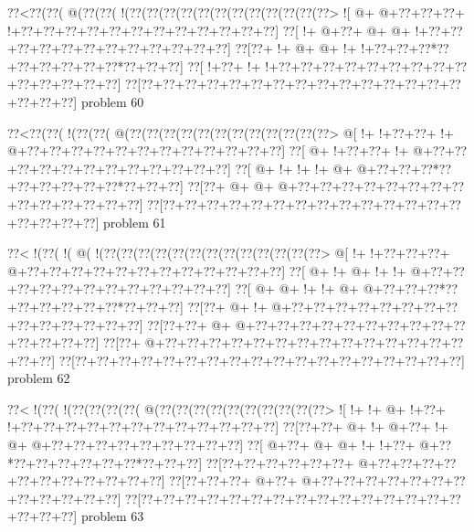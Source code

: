 \vbox{\vbox{\goo
\0??<\0??(\0??(\- @(\0??(\0??(\- !(\0??(\0??(\0??(\0??(\0??(\0??(\0??(\0??(\0??(\0??(\0??(\0??>
\- ![\- @+\- @+\0??+\0??+\0??+\- !+\0??+\0??+\0??+\0??+\0??+\0??+\0??+\0??+\0??+\0??+\0??+\0??]
\0??[\- !+\- @+\0??+\- @+\- @+\- !+\0??+\0??+\0??+\0??+\0??+\0??+\0??+\0??+\0??+\0??+\0??+\0??]
\0??[\0??+\- !+\- @+\- @+\- !+\- !+\0??+\0??+\0??*\0??+\0??+\0??+\0??+\0??+\0??*\0??+\0??+\0??]
\0??[\- !+\0??+\- !+\- !+\0??+\0??+\0??+\0??+\0??+\0??+\0??+\0??+\0??+\0??+\0??+\0??+\0??+\0??]
\0??[\0??+\0??+\0??+\0??+\0??+\0??+\0??+\0??+\0??+\0??+\0??+\0??+\0??+\0??+\0??+\0??+\0??+\0??]
}
\hfil problem 60\hfil\break
}



\vbox{\vbox{\goo
\0??<\0??(\0??(\- !(\0??(\0??(\- @(\0??(\0??(\0??(\0??(\0??(\0??(\0??(\0??(\0??(\0??(\0??(\0??>
\- @[\- !+\- !+\0??+\0??+\- !+\- @+\0??+\0??+\0??+\0??+\0??+\0??+\0??+\0??+\0??+\0??+\0??+\0??]
\0??[\- @+\- !+\0??+\0??+\- !+\- @+\0??+\0??+\0??+\0??+\0??+\0??+\0??+\0??+\0??+\0??+\0??+\0??]
\0??[\- @+\- !+\- !+\- !+\- @+\- @+\0??+\0??+\0??*\0??+\0??+\0??+\0??+\0??+\0??*\0??+\0??+\0??]
\0??[\0??+\- @+\- @+\- @+\0??+\0??+\0??+\0??+\0??+\0??+\0??+\0??+\0??+\0??+\0??+\0??+\0??+\0??]
\0??[\0??+\0??+\0??+\0??+\0??+\0??+\0??+\0??+\0??+\0??+\0??+\0??+\0??+\0??+\0??+\0??+\0??+\0??]
}
\hfil problem 61\hfil\break
}



\vbox{\vbox{\goo
\0??<\- !(\0??(\- !(\- @(\- !(\0??(\0??(\0??(\0??(\0??(\0??(\0??(\0??(\0??(\0??(\0??(\0??(\0??>
\- @[\- !+\- !+\0??+\0??+\0??+\- @+\0??+\0??+\0??+\0??+\0??+\0??+\0??+\0??+\0??+\0??+\0??+\0??]
\0??[\- @+\- !+\- @+\- !+\- !+\- @+\0??+\0??+\0??+\0??+\0??+\0??+\0??+\0??+\0??+\0??+\0??+\0??]
\0??[\- @+\- @+\- !+\- !+\- @+\- @+\0??+\0??+\0??*\0??+\0??+\0??+\0??+\0??+\0??*\0??+\0??+\0??]
\0??[\0??+\- @+\- !+\- @+\0??+\0??+\0??+\0??+\0??+\0??+\0??+\0??+\0??+\0??+\0??+\0??+\0??+\0??]
\0??[\0??+\0??+\- @+\- @+\0??+\0??+\0??+\0??+\0??+\0??+\0??+\0??+\0??+\0??+\0??+\0??+\0??+\0??]
\0??[\0??+\- @+\0??+\0??+\0??+\0??+\0??+\0??+\0??+\0??+\0??+\0??+\0??+\0??+\0??+\0??+\0??+\0??]
\0??[\0??+\0??+\0??+\0??+\0??+\0??+\0??+\0??+\0??+\0??+\0??+\0??+\0??+\0??+\0??+\0??+\0??+\0??]
}
\hfil problem 62\hfil\break
}



\vbox{\vbox{\goo
\0??<\- !(\0??(\- !(\0??(\0??(\0??(\0??(\- @(\0??(\0??(\0??(\0??(\0??(\0??(\0??(\0??(\0??(\0??>
\- ![\- !+\- !+\- @+\- !+\0??+\- !+\0??+\0??+\0??+\0??+\0??+\0??+\0??+\0??+\0??+\0??+\0??+\0??]
\0??[\0??+\0??+\- @+\- !+\- @+\0??+\- !+\- @+\- @+\0??+\0??+\0??+\0??+\0??+\0??+\0??+\0??+\0??]
\0??[\- @+\0??+\- @+\- @+\- !+\- !+\0??+\- @+\0??*\0??+\0??+\0??+\0??+\0??+\0??*\0??+\0??+\0??]
\0??[\0??+\0??+\0??+\0??+\0??+\0??+\- @+\0??+\0??+\0??+\0??+\0??+\0??+\0??+\0??+\0??+\0??+\0??]
\0??[\0??+\0??+\0??+\- @+\0??+\- @+\0??+\0??+\0??+\0??+\0??+\0??+\0??+\0??+\0??+\0??+\0??+\0??]
\0??[\0??+\0??+\0??+\0??+\0??+\0??+\0??+\0??+\0??+\0??+\0??+\0??+\0??+\0??+\0??+\0??+\0??+\0??]
}
\hfil problem 63\hfil\break
}



